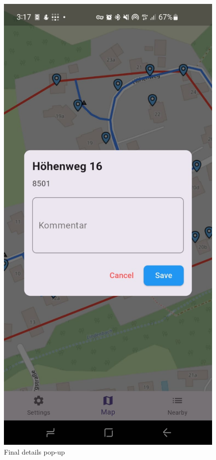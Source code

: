 \begin{figure}[H]
\begin{minipage}{0.3\textwidth}
    \end{minipage}
    \hspace{2cm}
    \begin{minipage}{0.3\textwidth}
        \centering
        \includegraphics[width=\textwidth]{images/paul/wireframes/finalDetails.jpeg}
        \caption{Final details pop-up}
    \end{minipage}
\end{figure}

